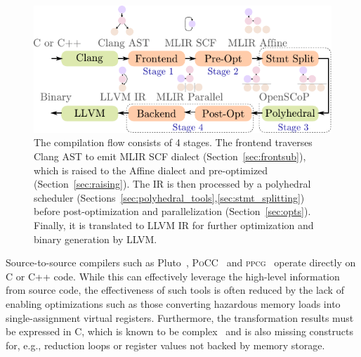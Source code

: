 \begin{figure}
\begin{center}
\includegraphics[scale=0.7]{images/mixed.pdf}
\caption{The \tool compilation flow consists of 4 stages. The frontend traverses Clang AST to emit MLIR SCF dialect (Section~\ref{sec:frontsub}), which is raised to the Affine dialect and pre-optimized (Section~\ref{sec:raising}). The IR is then processed by a polyhedral scheduler (Sections~\ref{sec:polyhedral_tools},\ref{sec:stmt_splitting}) before post-optimization and parallelization (Section~\ref{sec:opts}). Finally, it is translated to LLVM IR for further optimization and binary generation by LLVM.}
\label{fig:pipeline}
\end{center}
\end{figure}

Source-to-source compilers such as Pluto~\cite{Bondhugula2008Pluto}, \textsc{PoCC}~\cite{pocc} and \textsc{ppcg}~\cite{ppcg} operate directly on C or C++ code. While this can effectively leverage the high-level information from source code, the effectiveness of such tools is often reduced by the lack of enabling optimizations such as those converting hazardous memory loads into single-assignment virtual registers. Furthermore, the transformation results must be expressed in C, which is known to be complex~\cite{cloog,grosser2015polyhedral} and is also missing constructs for, e.g., reduction loops or register values not backed by memory storage.


